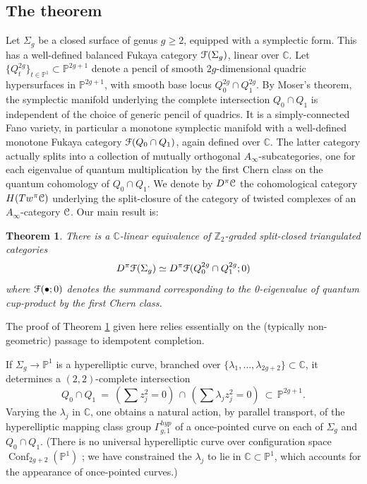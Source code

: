 \documentclass[reqno,10pt]{amsart}
\numberwithin{equation}{section}
\newcommand{\bC}{{\mathbb C}}
\newcommand{\bP}{{\mathbb P}}
\newcommand{\bZ}{{\mathbb Z}}
\newcommand{\scrC}{\EuScript{C}}
\newcommand{\scrF}{\EuScript{F}}
\newcommand{\Conf}{\operatorname{Conf}}
\newtheorem{Theorem}[thm]{Theorem}
\theoremstyle{remark}
\begin{document}
\subsection{The theorem}

Let $\Sigma_g$ be a closed surface of genus $g\geq 2$, equipped with a symplectic form.   This has a well-defined balanced Fukaya category $\scrF(\Sigma_g)$, linear over $\bC$.  Let $\{Q^{2g}_t\}_{t\in \bP^1} \subset \bP^{2g+1}$ denote a pencil of smooth $2g$-dimensional quadric hypersurfaces in $\bP^{2g+1}$, with smooth base locus $Q^{2g}_0 \cap Q^{2g}_1$.  By Moser's theorem, the symplectic manifold underlying the complete intersection $Q_0 \cap Q_1$ is  independent of the choice of generic pencil of quadrics.  It is a simply-connected Fano variety,  in particular a monotone symplectic manifold with a well-defined monotone Fukaya category $\scrF(Q_0\cap Q_1)$, again defined over $\bC$.   The latter category actually splits into a collection of mutually orthogonal $A_{\infty}$-subcategories, one for each eigenvalue of quantum multiplication by the first Chern class on the quantum cohomology of $Q_0\cap Q_1$.   We denote by $D^{\pi}\scrC$ the cohomological category $H(Tw^{\pi}\scrC)$ underlying the split-closure of the category of twisted complexes of an $A_{\infty}$-category $\scrC$.  Our main result is:

\begin{Theorem} \label{Thm:Embed}
There is a $\bC$-linear equivalence of $\bZ_2$-graded split-closed triangulated categories 
\[
D^{\pi}\scrF(\Sigma_g) \simeq D^{\pi}\scrF(Q_0^{2g} \cap Q_1^{2g};0)
\]
where $\scrF(\bullet;0)$ denotes the summand corresponding to the 0-eigenvalue of quantum cup-product by the first Chern class.
\end{Theorem}

The proof  of Theorem \ref{Thm:Embed} given here relies essentially on the  (typically non-geometric) passage to idempotent completion.  

If $\Sigma_g \rightarrow \bP^1$ is a hyperelliptic curve, branched over $\{\lambda_1, \ldots, \lambda_{2g+2}\} \subset \bC$, it determines a $(2,2)$-complete intersection
\[
Q_0 \cap Q_1 \ = \ \left ( \sum z_j^2 = 0 \right ) \, \cap \, \left ( \sum \lambda_j z_j^2 = 0 \right ) \ \subset \, \bP^{2g+1}.
\]
Varying the $\lambda_j$ in $\bC$, one obtains a natural action, by parallel transport, of the hyperelliptic mapping class group $\Gamma_{g,1}^{hyp}$ of a once-pointed curve on each of $\Sigma_g$ and $Q_0 \cap Q_1$.  (There is no universal hyperelliptic curve over configuration space $\Conf_{2g+2}(\bP^1)$  \cite{Mess}; we have constrained the $\lambda_j$ to lie in $\bC\subset \bP^1$, which accounts for the appearance of once-pointed curves.)
\end{document}
